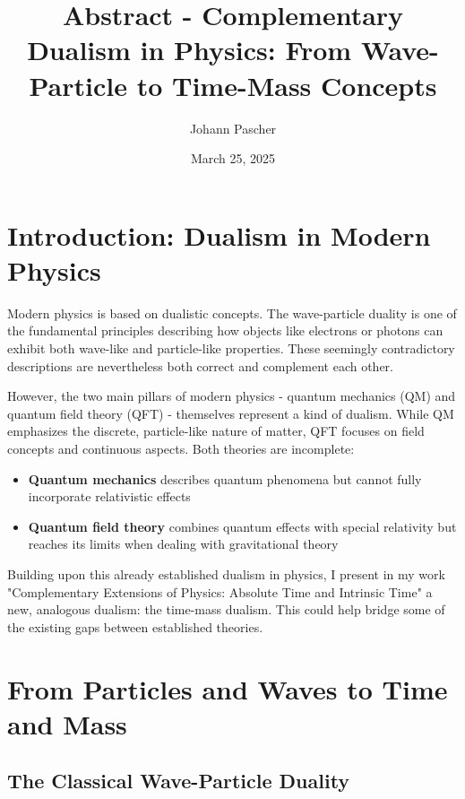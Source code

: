 \documentclass[a4paper,12pt]{article}
\begin{document}
	
	\title{Abstract - Complementary Dualism in Physics: From Wave-Particle to Time-Mass Concepts}
	\author{Johann Pascher}
	\date{March 25, 2025}
	\maketitle
	
	\section{Introduction: Dualism in Modern Physics}
	
	Modern physics is based on dualistic concepts. The wave-particle duality is one of the fundamental principles describing how objects like electrons or photons can exhibit both wave-like and particle-like properties. These seemingly contradictory descriptions are nevertheless both correct and complement each other.
	
	However, the two main pillars of modern physics - quantum mechanics (QM) and quantum field theory (QFT) - themselves represent a kind of dualism. While QM emphasizes the discrete, particle-like nature of matter, QFT focuses on field concepts and continuous aspects. Both theories are incomplete:
	
	\begin{itemize}
		\item \textbf{Quantum mechanics} describes quantum phenomena but cannot fully incorporate relativistic effects
		\item \textbf{Quantum field theory} combines quantum effects with special relativity but reaches its limits when dealing with gravitational theory
	\end{itemize}
	
	Building upon this already established dualism in physics, I present in my work "Complementary Extensions of Physics: Absolute Time and Intrinsic Time" a new, analogous dualism: the time-mass dualism. This could help bridge some of the existing gaps between established theories.
	
	\section{From Particles and Waves to Time and Mass}
	
	\subsection{The Classical Wave-Particle Duality}
	
\end{document}
